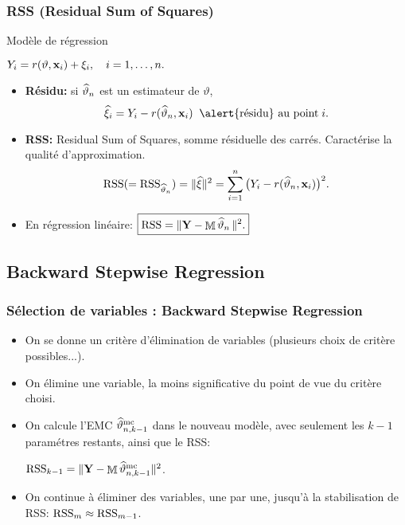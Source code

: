 \documentclass{beamer}
\DeclareMathOperator{\design}{\mathbb{M}}
\DeclareMathOperator{\est}{\widehat \vartheta_{\mathnormal{n}}}
\begin{document}
\begin{frame}
\frametitle{RSS (Residual Sum of Squares)} Mod\`ele de
régression\vspace{2mm} \centerline{$ Y_i= r(\vartheta, {\bf
x}_i)+\xi_i, \quad i=1,\dots,n.$}
\begin{itemize}
\item {\bf Résidu:} si $\est$ est un estimateur de
$\vartheta$,
$$\widehat \xi_i = Y_i - r(\est, {\bf x}_i)
\;\;\text{\alert{résidu} au point}\;i.$$
\item {\bf RSS:} \alert{ Residual Sum of Squares}, somme
résiduelle des carrés. Caractérise la qualité
d'approximation.
$${\rm RSS}(={\rm RSS}_{\est})=\|\widehat \xi\|^2
= \sum_{i = 1}^n\big(Y_i - r(\est,{\bf x}_i)\big)^2.$$
\item En régression \alert{linéaire}:
$\boxed{{\rm RSS}= \|{\bf Y}-\design\est\|^2.}$
\end{itemize}
\end{frame}

\subsection{Backward Stepwise Regression}

\begin{frame}
\frametitle{Sélection de variables : Backward Stepwise Regression}
\begin{itemize}
\item On se donne un crit\`ere d'élimination de variables
\alert{(plusieurs choix de crit\`ere possibles...)}.
\item On élimine une
variable, la moins significative du point de vue du crit\`ere
choisi.
\item On calcule l'EMC $\widehat\vartheta_{n,k-1}^{\rm mc}$ dans le nouveau mod\`ele, avec seulement
les $k-1$ paramétres restants, ainsi que le RSS:\vspace{1mm}
\centerline{${\rm RSS}_{k-1}=\|{\bf
Y}-\design\widehat\vartheta_{n,k-1}^{\rm mc}\|^2$.}\vspace{1mm}
\item On continue \`a éliminer des variables, une par une,
jusqu'\`a la \alert{stabilisation de RSS}: ${\rm
RSS}_{m}\approx {\rm RSS}_{m-1}$.
\end{itemize}
\end{frame}
\end{document}
